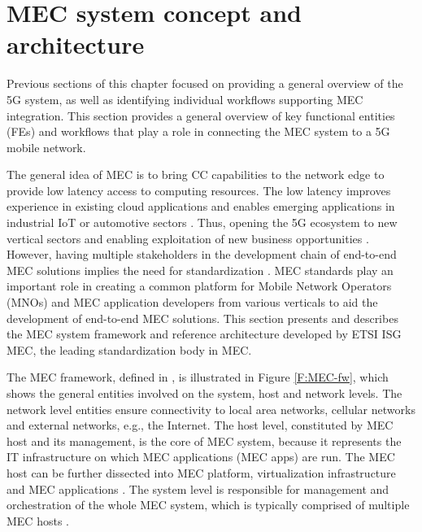 \documentclass[12pt,a4paper,twoside]{report}
\begin{document}
\section{MEC system concept and architecture}
Previous sections of this chapter focused on providing a general overview of the 5G system, as well as identifying individual workflows supporting MEC integration. This section provides a general overview of key functional entities (FEs) and workflows that play a role in connecting the MEC system to a 5G mobile network.

The general idea of MEC is to bring CC capabilities to the network edge to provide low latency access to computing resources. The low latency improves experience in existing cloud applications and enables emerging applications in industrial IoT or automotive sectors \cite{ETSI:wp36}. Thus, opening the 5G ecosystem to new vertical sectors and enabling exploitation of new business opportunities \cite{sabella-mec-sw-dev}. However, having multiple stakeholders in the development chain of end-to-end MEC solutions implies the need for standardization \cite{ETSI:wp36}. MEC standards play an important role in creating a common platform for Mobile Network Operators (MNOs) and MEC application developers from various verticals to aid the development of end-to-end MEC solutions. This section presents and describes the MEC system framework and reference architecture developed by ETSI ISG MEC, the leading standardization body in MEC. 

The MEC framework, defined in \cite{ETSI:GS:MEC003}, is illustrated in Figure \ref{F:MEC-fw}, which shows the general entities involved on the  system, host and network levels. The network level entities ensure connectivity to local area networks, cellular networks and external networks, e.g., the Internet. The host level, constituted by MEC host and its management, is the core of MEC system, because it represents the IT infrastructure on which MEC applications (MEC apps) are run. The MEC host can be further dissected into MEC platform, virtualization infrastructure and MEC applications \cite{ETSI:GS:MEC003}. The system level is responsible for management and orchestration of the whole MEC system, which is typically comprised of multiple MEC hosts \cite{ETSI:GS:MEC003,sabella-mec-sw-dev}. 
\end{document}
